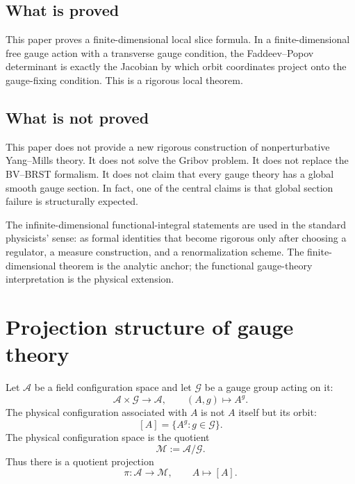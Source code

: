 \documentclass[11pt]{article}
\newcommand{\A}{\mathcal A}
\newcommand{\G}{\mathcal G}
\newcommand{\M}{\mathcal M}
\begin{document}
\subsection{What is proved}

This paper proves a finite-dimensional local slice formula. In a finite-dimensional free gauge action with a transverse gauge condition, the Faddeev--Popov determinant is exactly the Jacobian by which orbit coordinates project onto the gauge-fixing condition. This is a rigorous local theorem.

\subsection{What is not proved}

This paper does not provide a new rigorous construction of nonperturbative Yang--Mills theory. It does not solve the Gribov problem. It does not replace the BV--BRST formalism. It does not claim that every gauge theory has a global smooth gauge section. In fact, one of the central claims is that global section failure is structurally expected.

The infinite-dimensional functional-integral statements are used in the standard physicists' sense: as formal identities that become rigorous only after choosing a regulator, a measure construction, and a renormalization scheme. The finite-dimensional theorem is the analytic anchor; the functional gauge-theory interpretation is the physical extension.

\begin{center}
\end{center}

\section{Projection structure of gauge theory}

Let \(\A\) be a field configuration space and let \(\G\) be a gauge group acting on it:
\[
\A\times\G\to\A,\qquad (A,g)\mapsto A^g.
\]
The physical configuration associated with \(A\) is not \(A\) itself but its orbit:
\[
[A]=\{A^g:g\in\G\}.
\]
The physical configuration space is the quotient
\[
\M:=\A/\G.
\]
Thus there is a quotient projection
\[
\pi:\A\to\M,\qquad A\mapsto [A].
\]
\end{document}
